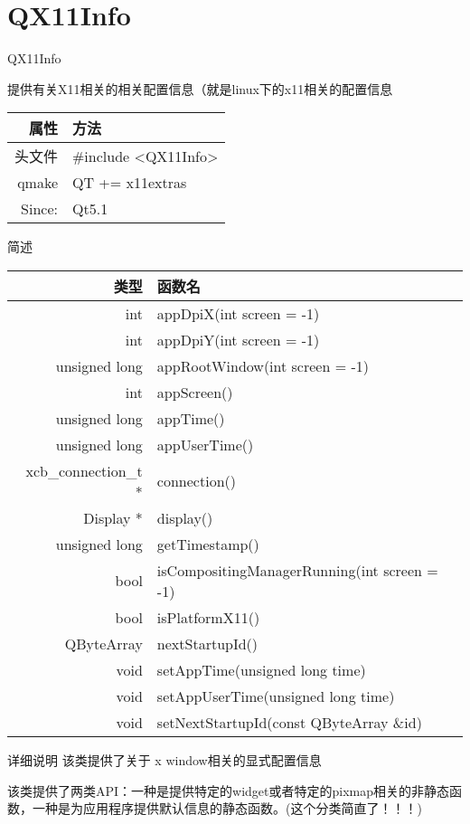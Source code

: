 \chapter{QX11Info}

QX11Info


提供有关X11相关的相关配置信息（就是linux下的x11相关的配置信息

\begin{tabular}{|r|l|}
	\hline
	属性 & 方法 \\
	\hline
	头文件 & \#include <QX11Info>\\      
	\hline
	qmake & QT += x11extras\\      
	\hline
    Since: & Qt5.1\\
    \hline
\end{tabular}


简述

\begin{tabular}{|r|l|}
\hline
类型 & 函数名 \\
\hline
int	& appDpiX(int screen = -1)\\
\hline
int	& appDpiY(int screen = -1) \\
\hline
unsigned long&	appRootWindow(int screen = -1) \\
\hline
int	&appScreen() \\
\hline
unsigned long&	appTime() \\ 
\hline
unsigned long&	appUserTime() \\
\hline
xcb\_connection\_t *	& connection() \\ 
\hline
Display *	&display()\\
\hline
unsigned long &	getTimestamp()\\
\hline
bool &	isCompositingManagerRunning(int screen = -1)\\
\hline
bool &	isPlatformX11() \\ 
\hline
QByteArray	& nextStartupId() \\
\hline
void &	setAppTime(unsigned long time)\\
\hline
void&	setAppUserTime(unsigned long time)\\
\hline
void&	setNextStartupId(const QByteArray \&id)\\
\hline
\end{tabular}

详细说明
该类提供了关于 x window相关的显式配置信息

该类提供了两类API：一种是提供特定的widget或者特定的pixmap相关的非静态函数，一种是为应用程序提供默认信息的静态函数。(这个分类简直了！！！)

